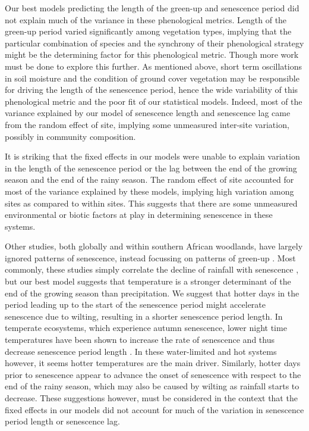 \documentclass[11pt,a4paper]{article}
\begin{document}
Our best models predicting the length of the green-up and senescence period did
not explain much of the variance in these phenological metrics. Length of the
green-up period varied significantly among vegetation types, implying that the
particular combination of species and the synchrony of their phenological
strategy might be the determining factor for this phenological metric. Though
more work must be done to explore this further. As mentioned above, short term
oscillations in soil moisture and the condition of ground cover vegetation may
be responsible for driving the length of the senescence period, hence the wide
variability of this phenological metric and the poor fit of our statistical
models. Indeed, most of the variance explained by our model of senescence
length and senescence lag came from the random effect of site, implying some
unmeasured inter-site variation, possibly in community composition. 

It is striking that the fixed effects in our models were unable to explain
variation in the length of the senescence period or the lag between the end of
the growing season and the end of the rainy season. The random effect of site
accounted for most of the variance explained by these models, implying high
variation among sites as compared to within sites. This suggests that there are
some unmeasured environmental or biotic factors at play in determining
senescence in these systems. 

Other studies, both globally and within southern African woodlands, have
largely ignored patterns of senescence, instead focussing on patterns of
green-up \citep{Gallinat2015}. Most commonly, these studies simply correlate
the decline of rainfall with senescence \citep{Stevens2016, Guan2014}, but our
best model suggests that temperature is a stronger determinant of the end of
the growing season than precipitation. We suggest that hotter days in the
period leading up to the start of the senescence period might accelerate
senescence due to wilting, resulting in a shorter senescence period length. In
temperate ecosystems, which experience autumn senescence, lower night time
temperatures have been shown to increase the rate of senescence and thus
decrease senescence period length \citep{Michelson2017, Escamilla2020}. In
these water-limited and hot systems however, it seems hotter temperatures are
the main driver. Similarly, hotter days prior to senescence appear to advance
the onset of senescence with respect to the end of the rainy season, which may
also be caused by wilting as rainfall starts to decrease. These suggestions
however, must be considered in the context that the fixed effects in our models
did not account for much of the variation in senescence period length or
senescence lag.
\end{document}
